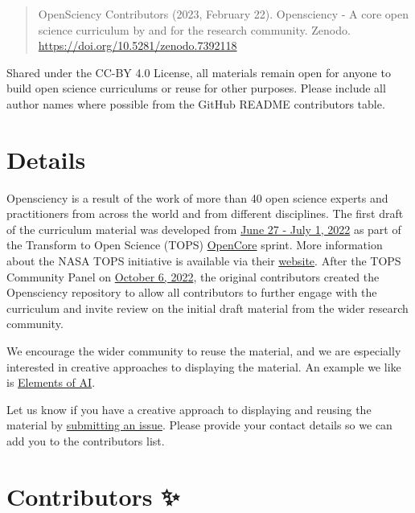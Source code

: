 \documentclass[
  letterpaper,
  DIV=11,
  numbers=noendperiod]{scrreport}
\begin{document}
\begin{quote}
OpenSciency Contributors (2023, February 22). Opensciency - A core open
science curriculum by and for the research community. Zenodo.
\url{https://doi.org/10.5281/zenodo.7392118}
\end{quote}

Shared under the CC-BY 4.0 License, all materials remain open for anyone
to build open science curriculums or reuse for other purposes. Please
include all author names where possible from the GitHub README
contributors table.

\hypertarget{details}{%
\section{Details}\label{details}}

Opensciency is a result of the work of more than 40 open science experts
and practitioners from across the world and from different disciplines.
The first draft of the curriculum material was developed from
\href{https://github.com/nasa/Transform-to-Open-Science/blob/main/docs/Area2_Capacity_Sharing/OpenCore/OpenCore_leads.md}{June
27 - July 1, 2022} as part of the Transform to Open Science (TOPS)
\href{https://github.com/nasa/Transform-to-Open-Science/tree/main/docs/Area2_Capacity_Sharing/OpenCore}{OpenCore}
sprint. More information about the NASA TOPS initiative is available via
their
\href{https://science.nasa.gov/open-science/transform-to-open-science}{website}.
After the TOPS Community Panel on
\href{https://github.com/nasa/Transform-to-Open-Science/blob/main/docs/Area1_Engagement/Community_Panels/20221005_community_panel.md}{October
6, 2022}, the original contributors created the Opensciency repository
to allow all contributors to further engage with the curriculum and
invite review on the initial draft material from the wider research
community.

We encourage the wider community to reuse the material, and we are
especially interested in creative approaches to displaying the material.
An example we like is \href{https://course.elementsofai.com/}{Elements
of AI}.

Let us know if you have a creative approach to displaying and reusing
the material by
\href{https://github.com/opensciency/sprint-content/issues}{submitting
an issue}. Please provide your contact details so we can add you to the
contributors list.

\hypertarget{contributors}{%
\section{Contributors ✨}\label{contributors}}
\end{document}
